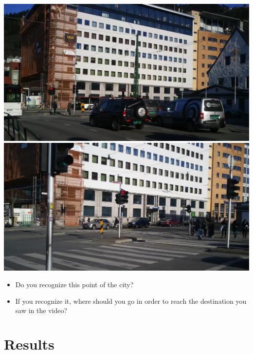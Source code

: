 \documentclass[12pt,a4paper,openright, notitlepage]{report}
\begin{document}
\includegraphics[width=\textwidth]{imgs/image-question33-1}
\includegraphics[width=\textwidth]{imgs/image-question33-2}

\begin{itemize}
	\item Do you recognize this point of the city?
	\item If you recognize it, where should you go in order to reach the destination you saw in the video?
\end{itemize}

\newpage


\section{Results}
\end{document}
